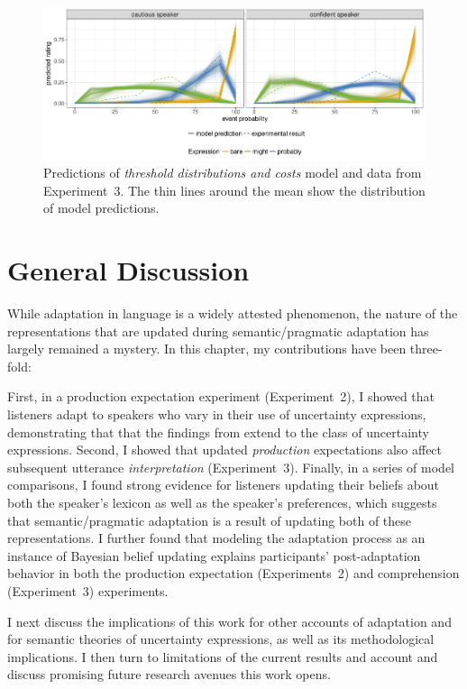 \begin{figure}
\includegraphics[width=\textwidth]{plots/fig-15-adaptation-posterior-comp-data.pdf}
\caption{Predictions of \textit{threshold distributions and costs} model and data from Experiment~3. The thin lines around the mean show the distribution of model predictions.  \label{fig:post-exposure-comp-data}}
\end{figure}


\section{General Discussion}

While adaptation in language is a widely attested phenomenon, the nature of the representations that are updated during semantic/pragmatic adaptation has largely remained a mystery. In this chapter, my contributions have been three-fold: 

First, in a production expectation experiment (Experiment~2), I showed that listeners adapt to speakers who vary in their use of uncertainty expressions, demonstrating that that 
the findings from \parencite{Yildirim2016} extend to the class of uncertainty expressions. Second, I showed that updated \emph{production} expectations also affect subsequent utterance \emph{interpretation}  (Experiment~3).  Finally, in a series of model comparisons, I found strong evidence for listeners updating their beliefs about both the speaker's lexicon as well as the speaker's preferences, which suggests
that semantic/pragmatic adaptation is a result of updating both of these representations. I further found that modeling the adaptation process as an instance of Bayesian
belief updating explains participants' post-adaptation behavior in both the production expectation (Experiments~2) and comprehension (Experiment~3) experiments. 

I next discuss the implications of this work for other accounts of adaptation and for semantic theories of uncertainty expressions, as well as its methodological implications. I then turn to limitations of the current results and account and discuss promising future research avenues this work opens. 


